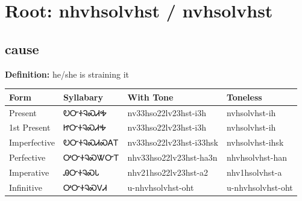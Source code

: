 \documentclass{article}%
\begin{document}
%
\normalsize%
\section*{Root: nhvhsolvhst / nvhsolvhst}%
\subsection*{cause}%
\textbf{Definition: }%
he/she is straining it%
\\[0.5em]%
\begin{tabular}{|l|l|l|l|}%
\hline%
\textbf{Form}&\textbf{Syllabary}&\textbf{With Tone}&\textbf{Toneless}\\%
\hline%
Present&ᎧᏅᏐᎸᏍᏗᎭ&nv33hso22lv23hst{-}i3h&nvhsolvhst{-}ih\\%
1st Present&ᏥᏅᏐᎸᏍᏗᎭ&nv33hso22lv23hst{-}i3h&nvhsolvhst{-}ih\\%
Imperfective&ᎧᏅᏐᎸᏍᏗᏍᎪᎢ&nv33hso22lv23hst{-}i33hsk&nvhsolvhst{-}ihsk\\%
Perfective&ᎤᏅᏐᎸᏍᏔᏅᎢ&nhv33hso22lv23hst{-}ha3n&nhvhsolvhst{-}han\\%
Imperative&ᎯᏅᏐᎸᏍᏓ&nhv21hso22lv23hst{-}a2&nhv1hsolvhst{-}a\\%
Infinitive&ᎤᏅᏐᎸᏍᏙᏗ&u{-}nhvhsolvhst{-}oht&u{-}nhvhsolvhst{-}oht\\%
\hline%
\end{tabular}%
\\[1em]%
\end{document}
